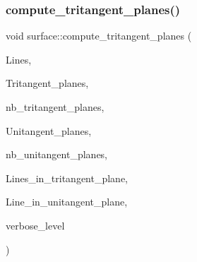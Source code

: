 \mbox{\label{classsurface_a7d760a4c2f956e943fce323171ad5c6b}} 
\subsubsection{\texorpdfstring{compute\+\_\+tritangent\+\_\+planes()}{compute\_tritangent\_planes()}}
{\footnotesize\ttfamily void surface\+::compute\+\_\+tritangent\+\_\+planes (\begin{DoxyParamCaption}\item[{\mbox{\hyperlink{galois_8h_a09fddde158a3a20bd2dcadb609de11dc}{I\+NT}} $\ast$}]{Lines,  }\item[{\mbox{\hyperlink{galois_8h_a09fddde158a3a20bd2dcadb609de11dc}{I\+NT}} $\ast$\&}]{Tritangent\+\_\+planes,  }\item[{\mbox{\hyperlink{galois_8h_a09fddde158a3a20bd2dcadb609de11dc}{I\+NT}} \&}]{nb\+\_\+tritangent\+\_\+planes,  }\item[{\mbox{\hyperlink{galois_8h_a09fddde158a3a20bd2dcadb609de11dc}{I\+NT}} $\ast$\&}]{Unitangent\+\_\+planes,  }\item[{\mbox{\hyperlink{galois_8h_a09fddde158a3a20bd2dcadb609de11dc}{I\+NT}} \&}]{nb\+\_\+unitangent\+\_\+planes,  }\item[{\mbox{\hyperlink{galois_8h_a09fddde158a3a20bd2dcadb609de11dc}{I\+NT}} $\ast$\&}]{Lines\+\_\+in\+\_\+tritangent\+\_\+plane,  }\item[{\mbox{\hyperlink{galois_8h_a09fddde158a3a20bd2dcadb609de11dc}{I\+NT}} $\ast$\&}]{Line\+\_\+in\+\_\+unitangent\+\_\+plane,  }\item[{\mbox{\hyperlink{galois_8h_a09fddde158a3a20bd2dcadb609de11dc}{I\+NT}}}]{verbose\+\_\+level }\end{DoxyParamCaption})}

\mbox{\label{classsurface_a6d8fafa386893521305e016011d55673}} 
